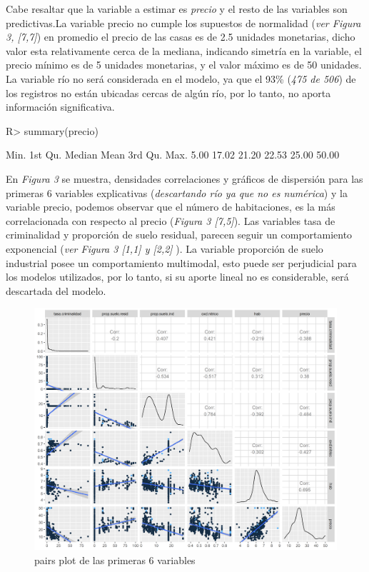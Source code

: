 \documentclass[nojss]{jss}
\begin{document}
Cabe resaltar que la variable a estimar es \textit{precio} y el resto de las variables son predictivas.La variable precio no cumple los supuestos de normalidad (\textit{ver Figura 3,  [7,7]}) en promedio el precio de las casas es de 2.5 unidades monetarias, dicho valor esta relativamente cerca de la mediana, indicando simetría en la variable, el precio mínimo es de 5 unidades monetarias, y el valor máximo es de 50 unidades. La variable río no será considerada en el modelo, ya que el 93\% (\textit{475 de 506}) de los registros no están ubicadas cercas de algún río, por lo tanto, no aporta información significativa.
 
\begin{CodeChunk}
\begin{CodeInput}
   R> summary(precio)
\end{CodeInput}

\begin{CodeOutput}
	Min.  1st Qu.  Median  Mean   3rd Qu.  Max. 
	5.00   17.02   21.20   22.53   25.00   50.00 
\end{CodeOutput}
\end{CodeChunk}

En \textit{Figura 3} se muestra, densidades correlaciones y gráficos de dispersión para las primeras 6 variables explicativas (\textit{descartando río ya que no es numérica}) y la variable precio, podemos observar que el número de habitaciones, es la más correlacionada con respecto al precio (\textit{Figura 3 [7,5]}). Las variables tasa de criminalidad y proporción de suelo residual, parecen seguir un comportamiento exponencial (\textit{ver Figura 3 [1,1] y [2,2]} ). La variable proporción de suelo industrial posee un comportamiento multimodal, esto puede ser perjudicial para los modelos utilizados, por lo tanto, si su aporte lineal no es considerable, será descartada del modelo.  
  
\begin{figure}[H]
	\centering
	\includegraphics[scale=1]{images/pairs1-1}
	\caption[pairs]{pairs plot de las primeras 6 variables}
	\label{fig:fig3}
\end{figure}  
\end{document}
